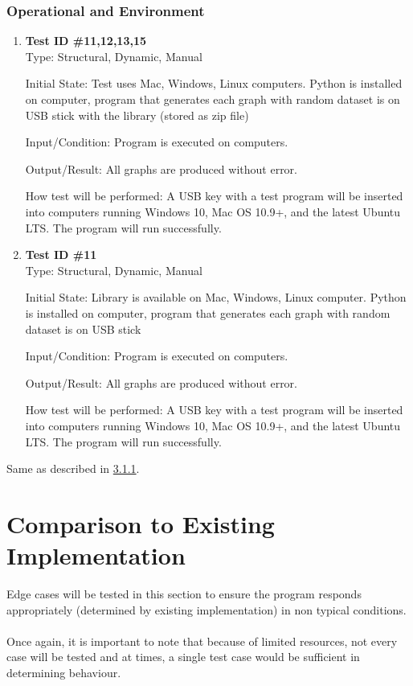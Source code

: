 \documentclass[12pt, titlepage]{article}
\begin{document}
  \subsubsection{Operational and Environment}
\begin{enumerate}
\item{\textbf{Test ID \#11,12,13,15 \\}}
Type: Structural, Dynamic, Manual
					
Initial State:    Test uses Mac, Windows, Linux computers. Python is installed on computer, program that generates each graph with random dataset is on USB stick with the library (stored as zip file)
					
Input/Condition: Program is executed on computers.
					
Output/Result: All graphs are produced without error.
					
How test will be performed: A USB key with a test program will be inserted into computers running Windows 10, Mac OS 10.9+, and the latest Ubuntu LTS. The program will run successfully.

\item{\textbf{Test ID \#11 \\}}
Type: Structural, Dynamic, Manual
					
Initial State:    Library is available on Mac, Windows, Linux computer. Python is installed on computer, program that generates each graph with random dataset is on USB stick
					
Input/Condition: Program is executed on computers.
					
Output/Result: All graphs are produced without error.
					
How test will be performed: A USB key with a test program will be inserted into computers running Windows 10, Mac OS 10.9+, and the latest Ubuntu LTS. The program will run successfully.

 \end{enumerate} 

		
Same as described in \hyperref[sec:3.1.1]{3.1.1}.

\section{Comparison to Existing Implementation}	
Edge cases will be tested in this section to ensure the program responds appropriately (determined by existing implementation) in non typical conditions. \\ \\
Once again, it is important to note that because of limited resources, not every case will be tested and at times, a single test case would be sufficient in determining behaviour.	
\end{document}
